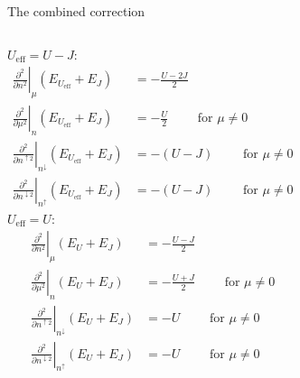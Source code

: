 \documentclass[xcolor=table,aspectratio=169]{beamer}
\numberwithin{equation}{section}
\begin{document}
\begin{frame}{The combined correction}
    \footnotesize
    \begin{columns}
        $U_\mathrm{eff} = U - J$:
        \begin{subequations}
            \begin{align}
                \left.\frac{\partial^2}{\partial n^2}\right|_{\mu} (E_{U_\mathrm{eff}} + E_J)                     & = -\frac{U-2J}{2}                            \nonumber  \\
                \left.\frac{\partial^2}{\partial \mu^2}\right|_{n} (E_{U_\mathrm{eff}} + E_J)                     & = -\frac{U}{2} \qquad \text{ for } \mu \neq 0 \nonumber \\
                \left.\frac{\partial^2}{\partial n^{\uparrow 2}}\right|_{n^\downarrow} (E_{U_\mathrm{eff}} + E_J) & = -(U - J) \qquad \text{ for } \mu \neq 0     \nonumber \\
                \left.\frac{\partial^2}{\partial n^{\downarrow 2}}\right|_{n^\uparrow} (E_{U_\mathrm{eff}} + E_J) & = -(U - J) \qquad \text{ for } \mu \neq 0\nonumber
            \end{align}
            \label{eqn:2nd_derivatives_ueff_plus_j}
        \end{subequations}
        $U_\mathrm{eff} = U$:
        \begin{subequations}
            \begin{align}
                \left.\frac{\partial^2}{\partial n^2}\right|_{\mu} (E_{U} + E_J)                     & = -\frac{U-J}{2}                                \nonumber \\
                \left.\frac{\partial^2}{\partial \mu^2}\right|_{n} (E_{U} + E_J)                     & = -\frac{U+J}{2} \qquad \text{ for } \mu \neq 0 \nonumber \\
                \left.\frac{\partial^2}{\partial n^{\uparrow 2}}\right|_{n^\downarrow} (E_{U} + E_J) & = -U \qquad \text{ for } \mu \neq 0             \nonumber \\
                \left.\frac{\partial^2}{\partial n^{\downarrow 2}}\right|_{n^\uparrow} (E_{U} + E_J) & = -U \qquad \text{ for } \mu \neq 0\nonumber
            \end{align}%
            \label{eqn:2nd_derivatives_u_plus_j}%
        \end{subequations}%
    \end{columns}
\end{frame}
\end{document}
